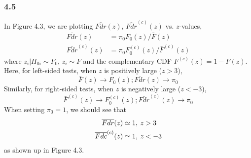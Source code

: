 \documentclass{article}
\begin{document}
\subsubsection*{4.5}
In Figure 4.3, we are plotting $\overline{Fdr}(z)$, $\overline{Fdr}^{(c)}(z)$ vs. $z$-values,
\begin{displaymath}
\begin{split}
\overline{Fdr}(z) &= \pi_0F_0(z) / \bar{F}(z) \\
\overline{Fdr}^{(c)}(z) &= \pi_0F_0^{(c)}(z) / \bar{F}^{(c)}(z)
\end{split}
\end{displaymath}
where $z_i | H_{0i} \sim F_0$, $z_i \sim F$ and the complementary CDF
$F^{(c)}(z)= 1 - F(z)$. \newline
Here, for left-sided tests, when $z$ is positively large ($z>3$),
\begin{displaymath}
\bar{F}(z) \rightarrow F_0(z);
\overline{Fdr}(z) \rightarrow \pi_0
\end{displaymath}
Similarly, for right-sided tests, when $z$ is negatively large ($z<-3$),
\begin{displaymath}
\bar{F}^{(c)}(z) \rightarrow F_0^{(c)}(z);
\overline{Fdr}^{(c)}(z) \rightarrow \pi_0
\end{displaymath}
When setting $\pi_0 = 1$, we should see that
\begin{displaymath}
\begin{split}
\overline{Fdr}(z) \simeq 1, &\hspace{4 pt} z>3 \\
\overline{Fdc}^{(c)}(z) \simeq 1, &\hspace{4 pt} z<-3 
\end{split}
\end{displaymath}
as shown up in Figure 4.3.
\end{document}
